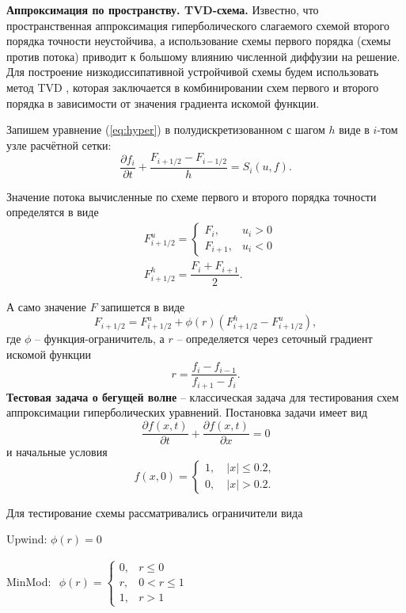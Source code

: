 {\bf Аппроксимация по пространству. TVD-схема.}
Известно, что пространственная аппроксимация гиперболического слагаемого схемой второго порядка точности неустойчива,
а использование схемы первого порядка (схемы против потока) приводит к большому влиянию численной диффузии на решение.
Для построение низкодиссипативной устройчивой схемы будем использовать метод TVD \cite{mazo1:2018},
которая заключается в комбинировании схем первого и второго порядка в зависимости от значения градиента искомой функции.

Запишем уравнение (\ref{eq:hyper}) в полудискретизованном с шагом $h$ виде в $i$-том узле расчётной сетки:
$$
\dfrac{\partial f_i}{\partial t}+\dfrac{F_{i + 1/2} - F_{i - 1/2}}{h} = S_i(u, f).
$$

Значение потока вычисленные по схеме первого и второго порядка точности определятся в виде
$$
\begin{aligned}
	&F^u_{i+1/2}=\begin{cases}
		F_i, &u_i>0\\
		F_{i+1},& u_i<0
	\end{cases}\\[10pt]
	&F^h_{i+1/2}=\dfrac{F_i + F_{i+1}}{2}.
\end{aligned}
$$

А само значение $F$ запишется в виде
$$
F_{i+1/2} = F^u_{i+1/2} + \phi(r) \left(F^h_{i+1/2} - F^u_{i+1/2}\right),
$$
где $\phi$ -- функция-ограничитель, а $r$ -- определяется через сеточный градиент искомой функции
$$
r = \frac{f_i - f_{i-1}}{f_{i+1} - f_{i}}.
$$
\clearpage
{\bf Тестовая задача о бегущей волне} -- классическая задача для тестирования схем аппроксимации гиперболических уравнений.
Постановка задачи имеет вид
\begin{equation*}
\dfrac{\partial f(x, t)}{\partial t}+\dfrac{\partial f(x, t)}{\partial x} = 0
\end{equation*}
и начальные условия
$$
f(x, 0) = \begin{cases}
	1, \quad \left|x\right| \leq 0.2,\\
	0, \quad \left|x\right| > 0.2.
\end{cases}
$$


Для тестирование схемы рассматривались ограничители вида 

Upwind: $ \phi(r)=0 $

MinMod: $
\begin{aligned}
	\phi(r)=\begin{cases}
	0, &r\leq 0\\
	r, &0<r\leq 1\\
	1, &r>1
    \end{cases}
\end{aligned}
$


